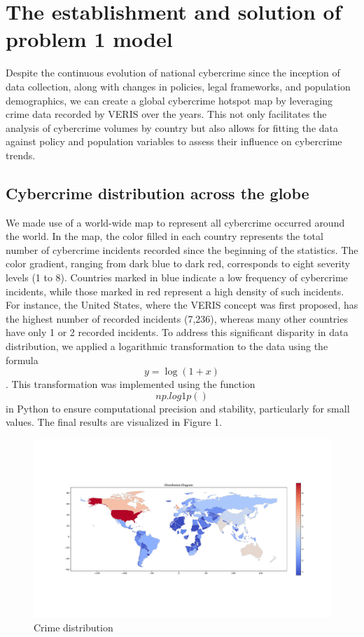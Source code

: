 \documentclass[12pt]{article}
\begin{document}
\section{The establishment and solution of problem 1 model}\label{sec:the-establishment-and-solution-of-problem-1-model} %
	Despite the continuous evolution of national cybercrime since the inception of data collection,
	along with changes in policies, legal frameworks, and population demographics,
	we can create a global cybercrime hotspot map by leveraging crime data recorded by VERIS over the years.
	This not only facilitates the analysis of cybercrime volumes by country
	but also allows for fitting the data against policy and population variables to assess their influence on cybercrime trends.
	\subsection{Cybercrime distribution across the globe}\label{subsec:Building-the-hotspot-map} %
		We made use of a world-wide map to represent all cybercrime occurred around the world.
		In the map, the color filled in each country represents the total number of cybercrime incidents recorded since the beginning of the statistics.
		The color gradient, ranging from dark blue to dark red, corresponds to eight severity levels (1 to 8).
		Countries marked in blue indicate a low frequency of cybercrime incidents, while those marked in red represent a high density of such incidents.
		For instance, the United States, where the VERIS concept was first proposed, has the highest number of recorded incidents (7,236),
		whereas many other countries have only 1 or 2 recorded incidents.
		To address this significant disparity in data distribution, we applied a logarithmic transformation to the data using the formula
		\[ y=\log(1+x) \].
		This transformation was implemented using the function
		\[ np.log1p() \]
		in Python to ensure computational precision and stability, particularly for small values.
		The final results are visualized in Figure 1.
		\begin{figure}[htbp]
			\centering
			\includegraphics[width=1\textwidth]{./rsrc/Crime_distribution}
			\caption{Crime distribution}\label{fig:crime-distribution}
		\end{figure}
\end{document}

